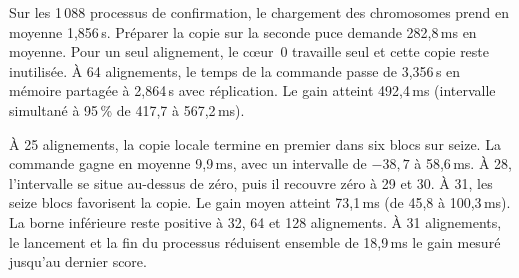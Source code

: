 Sur les 1\,088 processus de confirmation, le chargement des chromosomes prend en moyenne 1,856\,s. Préparer la copie sur la seconde puce demande 282,8\,ms en moyenne. Pour un seul alignement, le cœur~0 travaille seul et cette copie reste inutilisée. À 64 alignements, le temps de la commande passe de 3,356\,s en mémoire partagée à 2,864\,s avec réplication. Le gain atteint 492,4\,ms (intervalle simultané à 95\,\% de 417,7 à 567,2\,ms).

À 25 alignements, la copie locale termine en premier dans six blocs sur seize. La commande gagne en moyenne 9,9\,ms, avec un intervalle de \(-38{,}7\) à 58,6\,ms. À 28, l’intervalle se situe au-dessus de zéro, puis il recouvre zéro à 29 et 30. À 31, les seize blocs favorisent la copie. Le gain moyen atteint 73,1\,ms (de 45,8 à 100,3\,ms). La borne inférieure reste positive à 32, 64 et 128 alignements. À 31 alignements, le lancement et la fin du processus réduisent ensemble de 18,9\,ms le gain mesuré jusqu’au dernier score.

